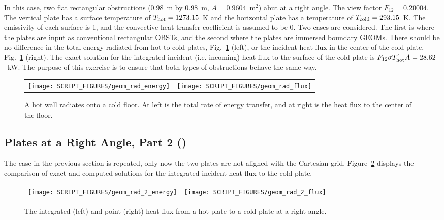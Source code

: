 \documentclass[11pt]{book}
\begin{document}
In this case, two flat rectangular obstructions (0.98~m by 0.98~m, $A=0.9604$~m$^2$) abut at a right angle. The view factor $F_{12}=0.20004$. The vertical plate has a surface temperature of $T_{\rm hot}=1273.15$~K and the horizontal plate has a temperature of $T_{\rm cold}=293.15$~K. The emissivity of each surface is 1, and the convective heat transfer coefficient is assumed to be 0. Two cases are considered. The first is where the plates are input as conventional rectangular {\ct OBST}s, and the second where the plates are immersed boundary {\ct GEOM}s. There should be no difference in the total energy radiated from hot to cold plates, Fig.~\ref{geom_rad_fig} (left), or the incident heat flux in the center of the cold plate, Fig.~\ref{geom_rad_fig} (right). The exact solution for the integrated incident (i.e. incoming) heat flux to the surface of the cold plate is $F_{12} \sigma T_{\rm hot}^4 A= 28.62$~kW. The purpose of this exercise is to ensure that both types of obstructions behave the same way.

\begin{figure}[!ht]
\begin{tabular*}{\textwidth}{lr}
\texttt{[image: SCRIPT\_FIGURES/geom\_rad\_energy]} &
\texttt{[image: SCRIPT\_FIGURES/geom\_rad\_flux]}
\end{tabular*}
\caption[Results of the {\ct geom\_rad} test case]{A hot wall radiates onto a cold floor. At left is the total rate of energy transfer, and at right is the heat flux to the center of the floor.}
\label{geom_rad_fig}
\end{figure}

\subsection{Plates at a Right Angle, Part 2 (\texorpdfstring{}{geom\_rad\_2}) }
\label{geom_rad_2}

The case in the previous section is repeated, only now the two plates are not aligned with the Cartesian grid. Figure~\ref{geom_rad_2_fig} displays the comparison of exact and computed solutions for the integrated incident heat flux to the cold plate.

\begin{figure}[!ht]
\begin{tabular*}{\textwidth}{lr}
\texttt{[image: SCRIPT\_FIGURES/geom\_rad\_2\_energy]} &
\texttt{[image: SCRIPT\_FIGURES/geom\_rad\_2\_flux]}
\end{tabular*}
\caption[Results of the {\ct geom\_rad\_2} test case]{The integrated (left) and point (right) heat flux from a hot plate to a cold plate at a right angle.}
\label{geom_rad_2_fig}
\end{figure}
\end{document}
